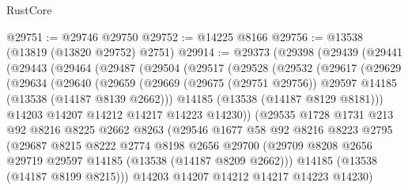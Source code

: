 \begin{lexlean}{RustCore}
\begin{coremodule}
@29751 := @29746 @29750
@29752 := @14225 @8166
@29756 := @13538 (@13819 (@13820 @29752) @2751)
@29914 := @29373
    (@29398
      (@29439
        (@29441
          (@29443
            (@29464
              (@29487
                (@29504
                  (@29517
                    (@29528
                      (@29532
                        (@29617
                          (@29629
                            (@29634
                              (@29640
                                (@29659
                                  (@29669
                                    (@29675 (@29751 @29756))
                                    @29597
                                    @14185
                                    (@13538 (@14187 @8139 @2662)))
                                  @14185
                                  (@13538 (@14187 @8129 @8181)))
                                @14203
                                @14207
                                @14212
                                @14217
                                @14223
                                @14230))
                            (@29535
                              @1728
                              @1731
                              @213
                              @92
                              @8216
                              @8225
                              @2662
                              @8263
                              (@29546
                                @1677
                                @58
                                @92
                                @8216
                                @8223
                                @2795
                                (@29687
                                  @8215
                                  @8222
                                  @2774
                                  @8198
                                  @2656
                                  @29700
                                  (@29709
                                    @8208
                                    @2656
                                    @29719
                                    @29597
                                    @14185
                                    (@13538 (@14187 @8209 @2662)))
                                  @14185
                                  (@13538 (@14187 @8199 @8215)))
                                @14203
                                @14207
                                @14212
                                @14217
                                @14223
                                @14230)

\end{coremodule}
\end{lexlean}

